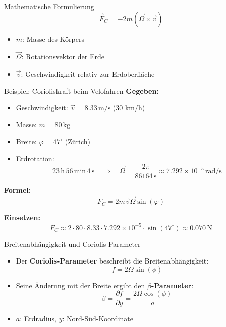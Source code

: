 \begin{frame}{Mathematische Formulierung}
	\begin{equation*}
		\vec{F}_C = -2m (\vec{\Omega} \times \vec{v})
	\end{equation*}
	\vspace{0.5cm}
	\begin{itemize}
		\item \( m \): Masse des Körpers
		\item \( \vec{\Omega} \): Rotationsvektor der Erde
		\item \( \vec{v} \): Geschwindigkeit relativ zur Erdoberfläche
	\end{itemize}
\end{frame}

\begin{frame}{Beispiel: Corioliskraft beim Velofahren}
	\textbf{Gegeben:}
	\begin{itemize}
	  \item Geschwindigkeit: \( \vec{v} = 8.33\,\mathrm{m/s} \) (30 km/h)
	  \item Masse: \( m = 80\,\mathrm{kg} \)
	  \item Breite: \( \varphi = 47^\circ \) (Zürich)
	  \item Erdrotation:
	  \[
	  23\,\mathrm{h}\,56\,\mathrm{min}\,4\,\mathrm{s} \quad\Rightarrow\quad
	  \vec{\Omega} = \frac{2\pi}{86164\,\mathrm{s}} \approx 7.292 \times 10^{-5}\,\mathrm{rad/s}
	  \]
	\end{itemize}
	
	\vspace{0.3cm}
	\textbf{Formel:}
	\[
	F_C = 2 m \vec{v} \vec{\Omega} \sin(\varphi)
	\]
	
	\vspace{0.3cm}
	\textbf{Einsetzen:}
	\[
	F_C \approx 2 \cdot 80 \cdot 8.33 \cdot 7.292 \times 10^{-5} \cdot \sin(47^\circ)
	\approx 0.070\, \mathrm{N}
	\]

	\end{frame}
	

\begin{frame}{Breitenabhängigkeit und Coriolis-Parameter}
	\begin{itemize}
		\item Der \textbf{Coriolis-Parameter} beschreibt die Breitenabhängigkeit:
		      \[
			      f = 2 \Omega \sin(\phi)
		      \]
		\item Seine Änderung mit der Breite ergibt den \textbf{\(\beta\)-Parameter}:
		      \[
			      \beta = \frac{\partial f}{\partial y} = \frac{2 \Omega \cos(\phi)}{a}
		      \]
		\item \(a\): Erdradius, \quad \(y\): Nord-Süd-Koordinate
	\end{itemize}
\end{frame}

